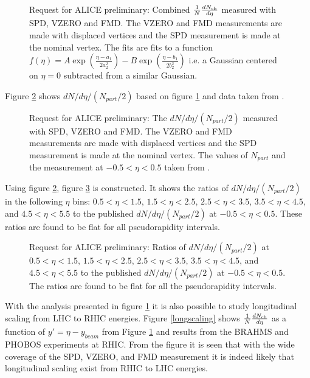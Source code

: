 \documentclass[11pt]{article}
\begin{document}
\begin{figure}
  \centering
  \caption{Request for ALICE preliminary: Combined $\dndeta$ measured
    with SPD, VZERO and FMD. The VZERO and FMD measurements are made
    with displaced vertices and the SPD measurement is made at the
    nominal vertex. The fits are fits to a function $f(\eta) = A\exp
    (\frac{\eta -a_1}{2 a_2^2}) - B\exp (\frac{\eta -b_1}{2 b_{2}^2})$
    i.e. a Gaussian centered on $ \eta = 0$ subtracted from a similar
    Gaussian.}
  \label{combineddndeta}
\end{figure} 

Figure \ref{dndetaoverNpart} shows $dN/d\eta/(N_{part}/2)$ based on
figure \ref{combineddndeta} and data taken from \cite{Aamodt:2010cz}.
\begin{figure}
  \centering
  \caption{Request for ALICE preliminary: The $dN/d\eta/(N_{part}/2)$
    measured with SPD, VZERO and FMD. The VZERO and FMD measurements
    are made with displaced vertices and the SPD measurement is made
    at the nominal vertex. The values of $N_{part}$ and the
    measurement at $-0.5<\eta<0.5$ taken from \cite{Aamodt:2010cz}.}
  \label{dndetaoverNpart}
\end{figure} 

Using figure \ref{dndetaoverNpart}, figure \ref{RatiodndetaoverNpart}
is constructed. It shows the ratios of $dN/d\eta/(N_{part}/2)$ in the
following $\eta$ bins: $0.5<\eta<1.5$, $1.5<\eta<2.5$, $2.5<\eta<3.5$,
$3.5<\eta<4.5$, and $4.5<\eta<5.5$ to the published
$dN/d\eta/(N_{part}/2)$ at $-0.5<\eta<0.5$. These ratios are found to
be flat for all pseudorapidity intervals.

\begin{figure}
  \centering
  \caption{Request for ALICE preliminary: Ratios of
    $dN/d\eta/(N_{part}/2)$ at $0.5<\eta<1.5$, $1.5<\eta<2.5$,
    $2.5<\eta<3.5$, $3.5<\eta<4.5$, and $4.5<\eta<5.5$ to the
    published $dN/d\eta/(N_{part}/2)$ at $-0.5<\eta<0.5$. The ratios
    are found to be flat for all the pseudorapidity intervals.}
  \label{RatiodndetaoverNpart}
\end{figure} 

With the analysis presented in figure \ref{combineddndeta} it is also
possible to study longitudinal scaling from LHC to RHIC
energies. Figure \ref{longscaling} shows $\dndeta$ as a function of
$y'=\eta-y_{beam}$ from Figure \ref{combineddndeta} and results from
the BRAHMS\cite{Bearden:2001qq} and PHOBOS\cite{Alver:2010ck}
experiments at RHIC. From the figure it is seen that with the wide
coverage of the SPD, VZERO, and FMD measurement it is indeed likely
that longitudinal scaling exist from RHIC to LHC energies.
\end{document}
